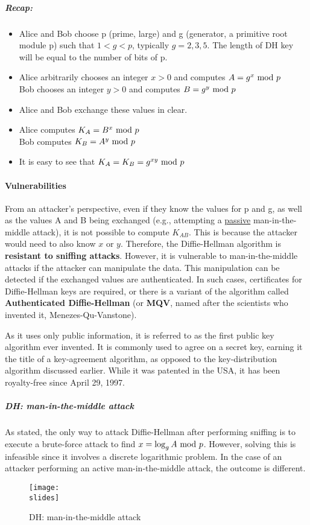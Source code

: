 \subparagraph*{Recap:}
\begin{itemize}
    \item Alice and Bob choose p (prime, large) and g (generator, a primitive root module p) such that $1 < g < p$, typically $g = 2,3,5$. The length of DH key will be equal to the number of bits of p.
    \item Alice arbitrarily chooses an integer $x >0$ and computes $ A = g^x \text{ mod } p $\\
          Bob chooses an integer $y >0$ and computes $ B = g^y\text{ mod } p $
    \item Alice and Bob exchange these values in clear.
    \item Alice computes $K_A = B^x\text{ mod } p$\\
          Bob computes $K_B = A^y\text{ mod } p$
    \item It is easy to see that $K_A = K_B = g^{xy} \text{ mod } p$
\end{itemize}

\paragraph*{Vulnerabilities}
From an attacker's perspective, even if they know the values for p and g, as well as the values A and B being exchanged (e.g., attempting a \underline{passive} man-in-the-middle attack), it is not possible to compute $K_{AB}$.
This is because the attacker would need to also know $x$ or $y$.
Therefore, the Diffie-Hellman algorithm is \textbf{resistant to sniffing attacks}.
However, it is vulnerable to man-in-the-middle attacks if the attacker can manipulate the data.
This manipulation can be detected if the exchanged values are authenticated. In such cases, certificates for Diffie-Hellman keys are required, or there is a variant of the algorithm called \textbf{Authenticated Diffie-Hellman} (or \textbf{MQV}, named after the scientists who invented it, Menezes-Qu-Vanstone).

As it uses only public information, it is referred to as the first public key algorithm ever invented. It is commonly used to agree on a secret key, earning it the title of a key-agreement algorithm, as opposed to the key-distribution algorithm discussed earlier. While it was patented in the USA, it has been royalty-free since April 29, 1997.

\subparagraph*{DH: man-in-the-middle attack}
As stated, the only way to attack Diffie-Hellman after performing sniffing is to execute a brute-force attack to find \(x = \log_{g} A \text{ mod } p\). However, solving this is infeasible since it involves a discrete logarithmic problem. In the case of an attacker performing an active man-in-the-middle attack, the outcome is different.
\begin{figure}[h]
    \centering
    \texttt{[image: \\slides]}
    \caption{DH: man-in-the-middle attack}
    \label{fig:DH_mitm}
\end{figure}

